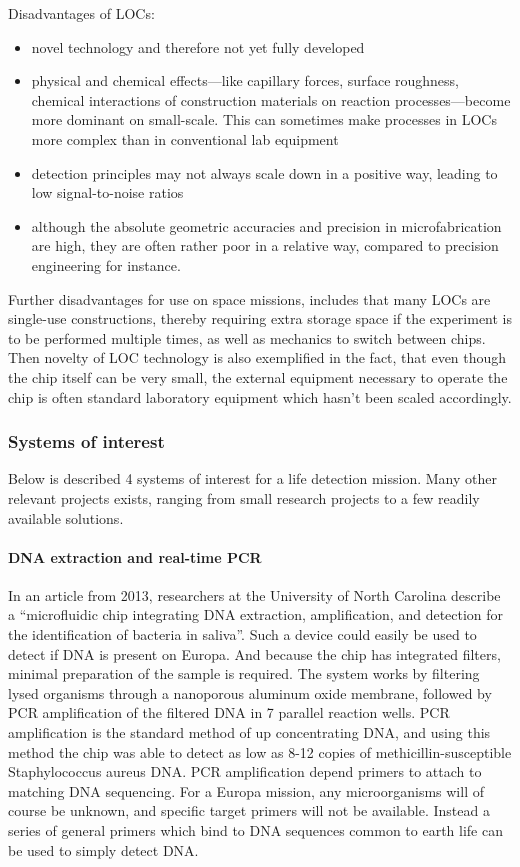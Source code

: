 Disadvantages of LOCs:
\begin{itemize}
    \item novel technology and therefore not yet fully developed
    \item physical and chemical effects—like capillary forces, surface roughness, chemical interactions of construction materials on reaction processes—become more dominant on small-scale. This can sometimes make processes in LOCs more complex than in conventional lab equipment
    \item detection principles may not always scale down in a positive way, leading to low signal-to-noise ratios
    \item although the absolute geometric accuracies and precision in microfabrication are high, they are often rather poor in a relative way, compared to precision engineering for instance.
\end{itemize}
Further disadvantages for use on space missions, includes that many LOCs are single-use constructions, thereby requiring extra storage space if the experiment is to be performed multiple times, as well as mechanics to switch between chips. Then novelty of LOC technology is also exemplified in the fact, that even though the chip itself can be very small, the external equipment necessary to operate the chip is often standard laboratory equipment which hasn’t been scaled accordingly.

\subsubsection{Systems of interest}
Below is described 4 systems of interest for a life detection mission. Many other relevant projects exists, ranging from small research projects to a few readily available solutions.

\paragraph{DNA extraction and real-time PCR}
In an article from 2013, researchers at the University of North Carolina describe a “microfluidic chip integrating DNA extraction, amplification, and detection for the identification of bacteria in saliva”. Such a device could easily be used to detect if DNA is present on Europa. And because the chip has integrated filters, minimal preparation of the sample is required. The system works by filtering lysed organisms through a nanoporous aluminum oxide membrane, followed by PCR amplification of the filtered DNA in 7 parallel reaction wells. PCR amplification is the standard method of up concentrating DNA, and using this method the chip was able to detect as low as 8-12 copies of methicillin-susceptible Staphylococcus aureus DNA. PCR amplification depend primers to attach to matching DNA sequencing. For a Europa mission, any microorganisms will of course be unknown, and specific target primers will not be available. Instead a series of general primers which bind to DNA sequences common to earth life can be used to simply detect DNA. 

